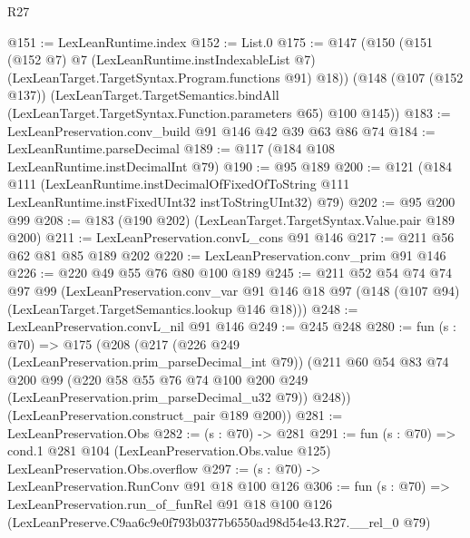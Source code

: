 \begin{lexlean}{R27}
\begin{coremodule}
@151 := LexLeanRuntime.index
@152 := List.{0}
@175 := @147
    (@150
      (@151
        (@152 @7)
        @7
        (LexLeanRuntime.instIndexableList @7)
        (LexLeanTarget.TargetSyntax.Program.functions @91)
        @18))
    (@148
      (@107 (@152 @137))
      (LexLeanTarget.TargetSemantics.bindAll
        (LexLeanTarget.TargetSyntax.Function.parameters @65)
        @100
        @145))
@183 := LexLeanPreservation.conv_build @91 @146 @42 @39 @63 @86 @74
@184 := LexLeanRuntime.parseDecimal
@189 := @117 (@184 @108 LexLeanRuntime.instDecimalInt @79)
@190 := @95 @189
@200 := @121
    (@184
      @111
      (LexLeanRuntime.instDecimalOfFixedOfToString
        @111
        LexLeanRuntime.instFixedUInt32
        instToStringUInt32)
      @79)
@202 := @95 @200 @99
@208 := @183 (@190 @202) (LexLeanTarget.TargetSyntax.Value.pair @189 @200)
@211 := LexLeanPreservation.convL_cons @91 @146
@217 := @211 @56 @62 @81 @85 @189 @202
@220 := LexLeanPreservation.conv_prim @91 @146
@226 := @220 @49 @55 @76 @80 @100 @189
@245 := @211
    @52
    @54
    @74
    @74
    @97
    @99
    (LexLeanPreservation.conv_var
      @91
      @146
      @18
      @97
      (@148 (@107 @94) (LexLeanTarget.TargetSemantics.lookup @146 @18)))
@248 := LexLeanPreservation.convL_nil @91 @146
@249 := @245 @248
@280 := fun (s : @70) =>
  @175
    (@208
      (@217
        (@226 @249 (LexLeanPreservation.prim_parseDecimal_int @79))
        (@211
          @60
          @54
          @83
          @74
          @200
          @99
          (@220 @58 @55 @76 @74 @100 @200 @249 (LexLeanPreservation.prim_parseDecimal_u32 @79))
          @248))
      (LexLeanPreservation.construct_pair @189 @200))
@281 := LexLeanPreservation.Obs
@282 := (s : @70) -> @281
@291 := fun (s : @70) =>
  cond.{1} @281 @104 (LexLeanPreservation.Obs.value @125) LexLeanPreservation.Obs.overflow
@297 := (s : @70) -> LexLeanPreservation.RunConv @91 @18 @100 @126
@306 := fun (s : @70) =>
  LexLeanPreservation.run_of_funRel
    @91
    @18
    @100
    @126
    (LexLeanPreserve.C9aa6c9e0f793b0377b6550ad98d54e43.R27.__rel_0 @79)
\end{coremodule}
\end{lexlean}
